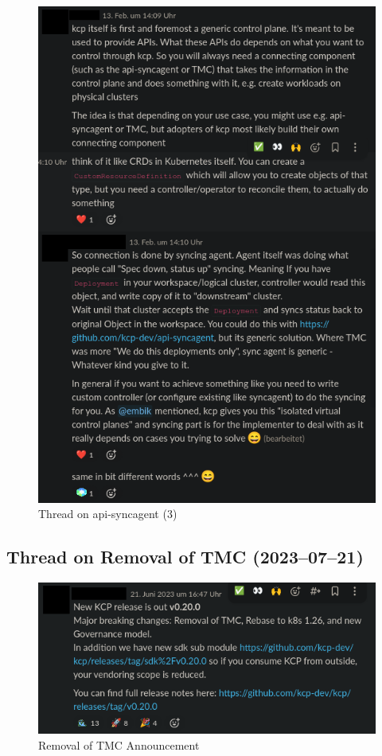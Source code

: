 \documentclass[11pt, a4paper, oneside, listof=totoc]{scrartcl}
\begin{document}
                \begin{figure}[h!]
                    \centering
                    \includegraphics[width=\textwidth]{screenshots/slack/apisyncagent3.anonymized.png}
                    \caption{Thread on api-syncagent (3)}\label{fig:api-syncagent3}
                \end{figure}

            \FloatBarrier
            \subsection{Thread on Removal of TMC (2023--07--21)}
                \begin{figure}[h!]
                    \centering
                    \includegraphics[width=\textwidth]{screenshots/slack/tmc-removal.anonymized.png}
                    \caption{Removal of TMC Announcement}\label{fig:tmc-removal}
                \end{figure}
\end{document}
